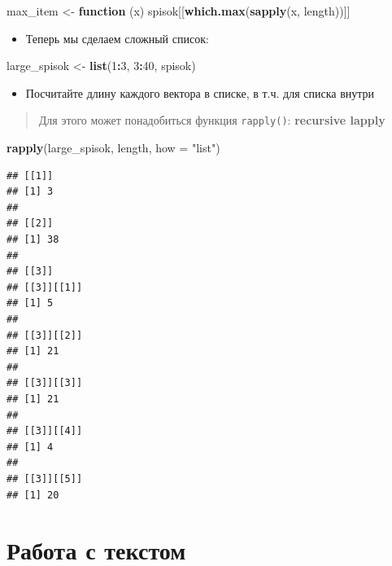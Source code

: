 \documentclass[]{book}
\newenvironment{Shaded}{\begin{snugshade}}{\end{snugshade}}
\newcommand{\KeywordTok}[1]{\textcolor[rgb]{0.13,0.29,0.53}{\textbf{#1}}}
\newcommand{\DataTypeTok}[1]{\textcolor[rgb]{0.13,0.29,0.53}{#1}}
\newcommand{\DecValTok}[1]{\textcolor[rgb]{0.00,0.00,0.81}{#1}}
\newcommand{\StringTok}[1]{\textcolor[rgb]{0.31,0.60,0.02}{#1}}
\newcommand{\ControlFlowTok}[1]{\textcolor[rgb]{0.13,0.29,0.53}{\textbf{#1}}}
\newcommand{\OperatorTok}[1]{\textcolor[rgb]{0.81,0.36,0.00}{\textbf{#1}}}
\newcommand{\NormalTok}[1]{#1}
\providecommand{\tightlist}{%
  \setlength{\itemsep}{0pt}\setlength{\parskip}{0pt}}
\begin{document}
\begin{Shaded}
\begin{Highlighting}[]
\NormalTok{max_item <-}\StringTok{ }\ControlFlowTok{function}\NormalTok{ (x) spisok[[}\KeywordTok{which.max}\NormalTok{(}\KeywordTok{sapply}\NormalTok{(x, length))]]}
\end{Highlighting}
\end{Shaded}

\begin{itemize}
\tightlist
\item
  Теперь мы сделаем сложный список:
\end{itemize}

\begin{Shaded}
\begin{Highlighting}[]
\NormalTok{large_spisok <-}\StringTok{ }\KeywordTok{list}\NormalTok{(}\DecValTok{1}\OperatorTok{:}\DecValTok{3}\NormalTok{, }\DecValTok{3}\OperatorTok{:}\DecValTok{40}\NormalTok{, spisok)}
\end{Highlighting}
\end{Shaded}

\begin{itemize}
\tightlist
\item
  Посчитайте длину каждого вектора в списке, в т.ч. для списка внутри
\end{itemize}

\begin{quote}
Для этого может понадобиться функция \texttt{rapply()}:
\textbf{recursive lapply}
\end{quote}

\begin{Shaded}
\begin{Highlighting}[]
\KeywordTok{rapply}\NormalTok{(large_spisok, length, }\DataTypeTok{how =} \StringTok{"list"}\NormalTok{)}
\end{Highlighting}
\end{Shaded}

\begin{verbatim}
## [[1]]
## [1] 3
## 
## [[2]]
## [1] 38
## 
## [[3]]
## [[3]][[1]]
## [1] 5
## 
## [[3]][[2]]
## [1] 21
## 
## [[3]][[3]]
## [1] 21
## 
## [[3]][[4]]
## [1] 4
## 
## [[3]][[5]]
## [1] 20
\end{verbatim}

\section{Работа с текстом}\label{solvtask_test}
\end{document}
